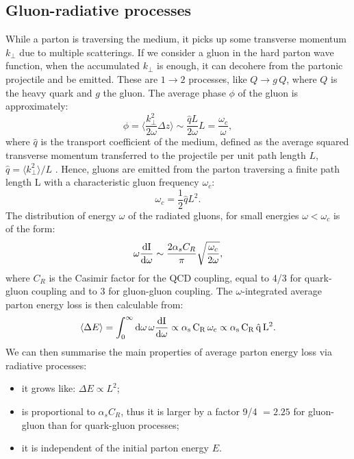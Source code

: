 \subsection{Gluon-radiative processes}
While a parton is traversing the medium, it picks up some transverse momentum $k_{\perp}$ due to multiple scatterings. 
If we consider a gluon in the hard parton wave function, when the accumulated $k_{\perp}$ is enough, it can decohere from the partonic projectile and be emitted.
These are $1 \rightarrow 2$ processes, like $Q \rightarrow g\, Q$, where $Q$ is the heavy quark and $g$ the gluon.
The average phase $\phi$ of the gluon is approximately:
\begin{equation}
\label{eq:gluonPhase}
\phi = {\Big \langle} \frac{k_{\perp}^2}{2\omega} \Delta z {\Big \rangle} \sim \frac{\hat{q} L}{2 \omega} L = \frac{\omega_c}{\omega},
\end{equation}
where $\hat{q}$ is the transport coefficient of the medium, defined as the average squared transverse 
momentum transferred to the projectile per unit path length $L$, $\hat{q} = \langle k_{\perp}^2 \rangle / L$ \cite{Salgado:2003gb,}.
Hence, gluons are emitted from the parton traversing a finite path length L with a characteristic gluon frequency $\omega_c$:
\begin{equation}
\label{eq:gluonPhase}
\omega_c = \frac{1}{2} \hat{q} L^2.
\end{equation}
The distribution of energy $\omega$ of the radiated gluons, for small energies $\omega < \omega_c$ is of the form:
\begin{equation}
\label{eq:gluonEnDistrb}
\omega \frac{\rm d I}{\rm d \omega} \sim \frac{2 \alpha_s C_R}{\pi} \sqrt{ \frac{\omega_c}{2 \omega}},
\end{equation}
where $C_R$ is the Casimir factor for the QCD coupling, equal to 4/3 for quark-gluon coupling and to 3 for gluon-gluon coupling.
The $\omega$-integrated average parton energy loss is then calculable from:
\begin{equation}
\label{eq:RadEnLoss}
\langle \Delta E \rangle = \int_0^\infty \rm d \omega \, \omega \frac{\rm d I}{\rm d \omega} \propto \alpha_s \, C_R \, \omega_c \propto \alpha_s \, C_R \, \hat{q} \, L^2. 
\end{equation}
We can then summarise the main properties of average parton energy loss via radiative processes:
\begin{itemize}
\item it grows like: $\Delta E \propto L^2$;
\item is proportional to $\alpha_s C_R$, thus it is larger by a factor 9/4 $ = 2.25$ for gluon-gluon than for quark-gluon processes;
\item it is independent of the initial parton energy $E$.
\end{itemize}
